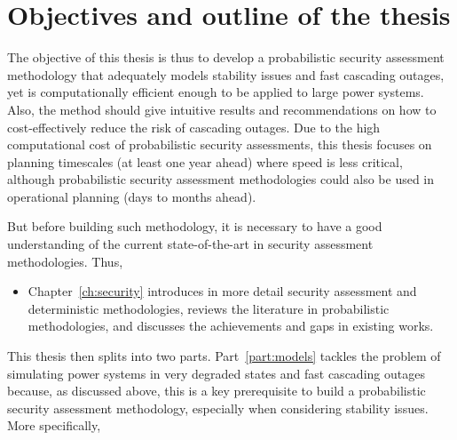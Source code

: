 \section{Objectives and outline of the thesis}

The objective of this thesis is thus to develop a probabilistic security assessment methodology that adequately models stability issues and fast cascading outages, yet is computationally efficient enough to be applied to large power systems. Also, the method should give intuitive results and recommendations on how to cost-effectively reduce the risk of cascading outages. Due to the high computational cost of probabilistic security assessments, this thesis focuses on planning timescales (at least one year ahead) where speed is less critical, although probabilistic security assessment methodologies could also be used in operational planning (days to months ahead).

But before building such methodology, it is necessary to have a good understanding of the current state-of-the-art in security assessment methodologies. Thus,

\begin{itemize}
    \item Chapter~\ref{ch:security} introduces in more detail security assessment and deterministic methodologies, reviews the literature in probabilistic methodologies, and discusses the achievements and gaps in existing works.
\end{itemize}

This thesis then splits into two parts. Part~\ref{part:models} tackles the problem of simulating power systems in very degraded states and fast cascading outages because, as discussed above, this is a key prerequisite to build a probabilistic security assessment methodology, especially when considering stability issues. More specifically,

